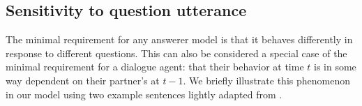 \documentclass[12pt, floatsintext, jou]{apa6}
\newcommand{\ndg}[1]{\textcolor{Green}{[ndg: #1]}}
\begin{document}



\subsection{Sensitivity to question utterance}

The minimal requirement for any answerer model is that it behaves differently in response to different questions. This can also be considered a special case of the minimal requirement for a dialogue agent: that their behavior at time $t$ is in some way dependent on their partner's at $t-1$. We briefly illustrate this phenomenon in our model using two example sentences lightly adapted from .
\end{document}
